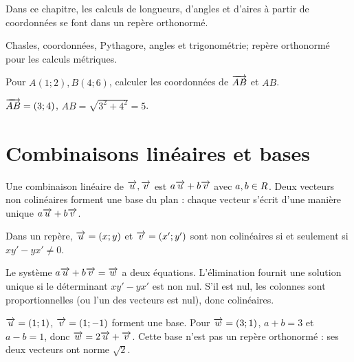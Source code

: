 \label{t11s-c13}
Dans ce chapitre, les calculs de longueurs, d’angles et d’aires à partir de coordonnées se font dans un repère orthonormé.
\begin{revision}Chasles, coordonnées, Pythagore, angles et trigonométrie; repère orthonormé pour les calculs métriques.\end{revision}
\begin{automatismes}\exo\label{t11s-c13-auto}Pour $A(1;2),B(4;6)$, calculer les coordonnées de $\overrightarrow{AB}$ et $AB$.\end{automatismes}
\begin{corrige}\label{sol-t11s-c13-auto}$\overrightarrow{AB}=(3;4)$, $AB=\sqrt{3^2+4^2}=5$.\end{corrige}

\section{Combinaisons linéaires et bases}
\begin{definition}Une combinaison linéaire de $\overrightarrow{u},\overrightarrow{v}$ est $a\overrightarrow{u}+b\overrightarrow{v}$ avec $a,b\in R$. Deux vecteurs non colinéaires forment une base du plan : chaque vecteur s’écrit d’une manière unique $a\overrightarrow{u}+b\overrightarrow{v}$.\end{definition}
\begin{propriete}Dans un repère, $\overrightarrow{u}=(x;y)$ et $\overrightarrow{v}=(x';y')$ sont non colinéaires si et seulement si $xy'-yx'\ne0$.\end{propriete}
\begin{demonstration}Le système $a\overrightarrow{u}+b\overrightarrow{v}=\overrightarrow{w}$ a deux équations. L’élimination fournit une solution unique si le déterminant $xy'-yx'$ est non nul. S’il est nul, les colonnes sont proportionnelles (ou l’un des vecteurs est nul), donc colinéaires.\end{demonstration}
\begin{exemple}$\overrightarrow{u}=(1;1)$, $\overrightarrow{v}=(1;-1)$ forment une base. Pour $\overrightarrow{w}=(3;1)$, $a+b=3$ et $a-b=1$, donc $\overrightarrow{w}=2\overrightarrow{u}+\overrightarrow{v}$. Cette base n’est pas un repère orthonormé : ses deux vecteurs ont norme $\sqrt2$.\end{exemple}
